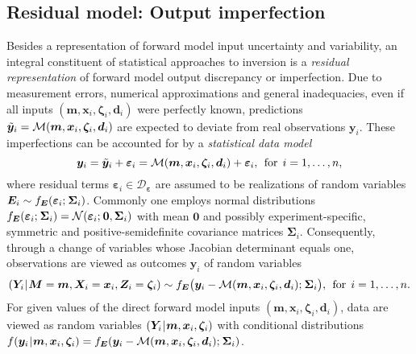\subsection{Residual model: Output imperfection} \label{sec:PEM:Multilevel:Residual}
Besides a representation of forward model input uncertainty and variability,
an integral constituent of statistical approaches to inversion is a \textit{residual representation} of forward model output discrepancy or imperfection.
Due to measurement errors, numerical approximations and general inadequacies, even if all inputs \((\bm{m},\bm{x}_i,\bm{\zeta}_i,\bm{d}_i)\) were perfectly known,
predictions \(\tilde{\bm{y}}_i = \mathcal{M}(\bm{m},\bm{x}_i,\bm{\zeta}_i,\bm{d}_i)\) are expected to deviate from real observations \(\bm{y}_i\).
These imperfections can be accounted for by a \textit{statistical data model}
\begin{equation} \label{eq:PEM:Multilevel:StatisticalDataModel}
  \bm{y}_i = \tilde{\bm{y}}_i + \bm{\varepsilon}_i = \mathcal{M}(\bm{m},\bm{x}_i,\bm{\zeta}_i,\bm{d}_i) + \bm{\varepsilon}_i,
  \;\, \text{for} \;\, i=1,\ldots,n,
\end{equation}
where residual terms \(\bm{\varepsilon}_i \in \mathcal{D}_{\bm{\varepsilon}}\) are assumed to be realizations of random variables \(\bm{E}_i \sim f_{\bm{E}}(\bm{\varepsilon}_i ;{\:\!} \bm{\Sigma}_i)\).
Commonly one employs normal distributions \(f_{\bm{E}}(\bm{\varepsilon}_i ;{\:\!} \bm{\Sigma}_i) = \mathcal{N}(\bm{\varepsilon}_i ;{\:\!} \bm{0},\bm{\Sigma}_i)\)
with mean \(\bm{0}\) and possibly experiment-specific, symmetric and positive-semidefinite covariance matrices \(\bm{\Sigma}_i\).
Consequently, through a change of variables whose Jacobian determinant equals one, observations are viewed as outcomes \(\bm{y}_i\) of random variables
\begin{equation} \label{eq:PEM:Multilevel:ResidualModel}
  (\bm{Y}_i {\:\!}|{\:\!} \bm{M} = \bm{m},\bm{X}_i = \bm{x}_i,\bm{Z}_i = \bm{\zeta}_i) \sim f_{\bm{E}} \big( \bm{y}_i-\mathcal{M}(\bm{m},\bm{x}_i,\bm{\zeta}_i,\bm{d}_i) ;{\:\!} \bm{\Sigma}_i \big),
  \;\, \text{for} \;\, i=1,\ldots,n.
\end{equation}
For given values of the direct forward model inputs \((\bm{m},\bm{x}_i,\bm{\zeta}_i,\bm{d}_i)\),
data are viewed as random variables \((\bm{Y}_i {\:\!}|{\:\!} \bm{m},\bm{x}_i,\bm{\zeta}_i)\) with conditional distributions
\(f (\bm{y}_i {\:\!}|{\:\!} \bm{m},\bm{x}_i,\bm{\zeta}_i) = f_{\bm{E}} (\bm{y}_i-\mathcal{M}(\bm{m},\bm{x}_i,\bm{\zeta}_i,\bm{d}_i) ;{\:\!} \bm{\Sigma}_i)\).

